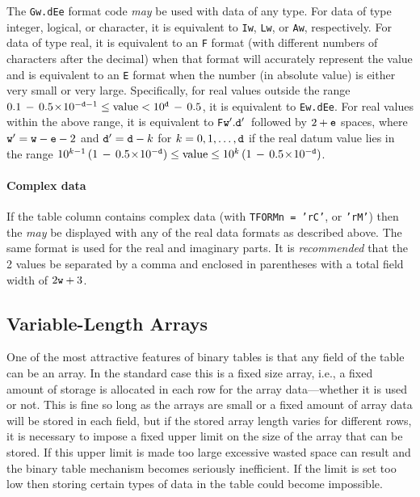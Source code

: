 \documentclass[11pt,makeidx]{book}     %
\begin{document}
 The {\tt G}{\tt w.d\/}{\tt E}{\tt e\/} format code {\em may} be used with
 data of any type.  For data of type integer, logical, or character, it
 is equivalent to {\tt I}{\tt w}, {\tt L}{\tt w}, or 
 {\tt A}{\tt w}, respectively.  For data of type real, it is
 equivalent to an {\tt F} format (with different numbers of characters
 after the decimal) when that format will accurately represent the value
 and is equivalent to an {\tt E} format when the number (in absolute
 value) is either very small or very large.  Specifically, for real
 values outside the range 
 $0.1\,-\,0.5\!\times\! 10^{-{\tt d}-1} \leq {\rm value} < 10^{\tt d}\,-\,0.5$,
 it is
 equivalent to {\tt E}{\tt w.d}{\tt E}{\tt e}. For real values
 within the above range, it is equivalent to 
 {\tt F}{${\tt w}^{\prime}.{\tt d}^{\prime}\,$} followed by 
 $2 + {\tt e}$ spaces, where
 ${\tt w}^{\prime} = {\tt w} - {\tt e} - 2$ and ${\tt d}^{\prime} = 
 {\tt d} - k$ for 
 $k = 0,1,\ldots,{\tt d}$ if the real datum value lies in the range $10^{k-1}
 \left(1\,-\, 0.5\!\times\!10^{-{\tt d}}\right) \leq {\rm value} \le  10^k
 \left(1\,-\, 0.5\!\times\!10^{-{\tt d}}\right)$.

 \paragraph{Complex data}  If the table column contains complex data
  (with {\tt TFORMn = 'rC'}, or {\tt 'rM'})
 then the {\em may} be displayed with any of the real data formats as described
 above.  The same format is used for the real and imaginary parts.
 It is {\em recommended} that the 2 values be separated by a comma and enclosed 
 in parentheses with a total field width of $2{\tt w} + 3$.

\subsection{Variable-Length Arrays}
\label{s:app_varlen}

    One of the most attractive features of binary tables is that any
field of the table can be an array.  In the standard case this is a
fixed size array, i.e., a fixed amount of storage is allocated in each
row for the array data---whether it is used or not.  This is fine
so long as the arrays are small or a fixed amount of array data will
be stored in each field, but if the stored array length varies for
different rows, it is necessary to impose a fixed upper limit on
the size of the array that can be stored.  If this upper limit is made
too large excessive wasted space can result and the binary table
mechanism becomes seriously inefficient.  If the limit is set too low
then storing certain types of data in the table could become impossible.
\end{document}
